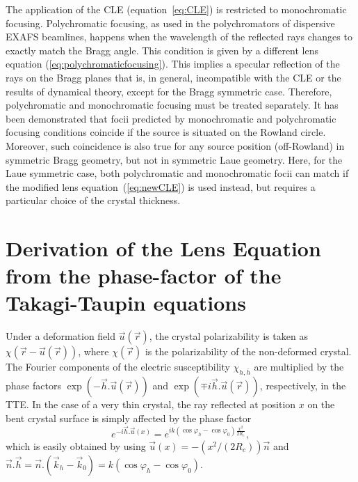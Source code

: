 \documentclass[preprint]{iucr}              %
\newcommand{\inred}[1]{{\color{red}#1}}
\begin{document}
The application of the CLE (equation~\ref{eq:CLE}) is restricted to monochromatic focusing. Polychromatic focusing, as used in the polychromators of dispersive EXAFS beamlines, happens when the wavelength of the reflected rays changes to exactly match the Bragg angle. This condition is given by a different lens equation (\ref{eq:polychromaticfocusing}). This implies a specular reflection of the rays on the Bragg planes that is, in general, incompatible with the CLE or the results of dynamical theory, except for the Bragg symmetric case. Therefore, polychromatic and monochromatic focusing must be treated separately. It has been demonstrated that focii predicted by monochromatic and polychromatic focusing conditions coincide if the source is situated on the Rowland circle. Moreover, such coincidence is also true for any source position (off-Rowland) in symmetric Bragg geometry, but not in symmetric Laue geometry. Here, for the Laue symmetric case, both polychromatic and monochromatic focii can match if the modified lens equation~(\ref{eq:newCLE}) is used instead, but requires a particular choice of the crystal thickness.







\appendix
\section{\inred{Derivation of the} Lens Equation from the phase-factor of the Takagi-Taupin equations}
\label{appendix:CLE}

\inred{Under} a deformation field $\vec u(\vec r)$, the crystal polarizability \inred{is} taken as 
$\chi(\vec r-\vec u(\vec r))$, where $\chi(\vec r)$ is the
polarizability of the non-deformed crystal. The Fourier components of the electric susceptibility $\chi_{h,\bar h}$ are multiplied by the phase factors $\exp(-  \vec h . \vec u (\vec r))$ and $\exp(\mp i \vec h . \vec u (\vec r))$, respectively, in the TTE.
In the case of a very thin crystal, the ray \inred{reflected at position} $x$ on the \inred{bent} crystal surface is simply affected by the phase factor 
\begin{equation}
    \label{eq:phasefactor11}
    e^{-i \vec h . \vec u(x)} = e^{i k (\cos\varphi_h-\cos\varphi_0) \frac{x^2}{2 R_c} },
\end{equation}
which is easily obtained by using $\vec u(x) = -(x^2/(2R_c))\vec n$ and $\vec n . \vec h = \vec n.(\vec k_h - \vec k_0) = k(\cos\varphi_h-\cos\varphi_0)$. 
\end{document}
